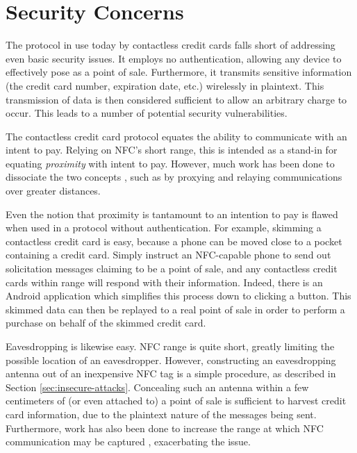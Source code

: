 \section{Security Concerns}
\label{sec:intro-security}

The protocol in use today by contactless credit cards falls short of addressing even basic security issues.
It employs no authentication, allowing any device to effectively pose as a point of sale.
Furthermore, it transmits sensitive information (the credit card number, expiration date, etc.) wirelessly in plaintext.
This transmission of data is then considered sufficient to allow an arbitrary charge to occur.
This leads to a number of potential security vulnerabilities.

The contactless credit card protocol equates the ability to communicate with an intent to pay.
Relying on NFC's short range, this is intended as a stand-in for equating \emph{proximity} with intent to pay.
However, much work has been done to dissociate the two concepts \cite{brown2013evaluating, Drimer:2007:KYE:1362903.1362910, francis2010practical, hancke2005practical, markantonakis2012practical}, such as by proxying and relaying communications over greater distances.

Even the notion that proximity is tantamount to an intention to pay is flawed when used in a protocol without authentication.
For example, skimming a contactless credit card is easy, because a phone can be moved close to a pocket containing a credit card.
Simply instruct an NFC-capable phone to send out solicitation messages claiming to be a point of sale, and any contactless credit cards within range will respond with their information.
Indeed, there is an Android application \cite{NFCProxy} which simplifies this process down to clicking a button.
This skimmed data can then be replayed to a real point of sale in order to perform a purchase on behalf of the skimmed credit card.

Eavesdropping is likewise easy.
NFC range is quite short, greatly limiting the possible location of an eavesdropper.
However, constructing an eavesdropping antenna out of an inexpensive NFC tag is a simple procedure, as described in Section \ref{sec:insecure-attacks}.
Concealing such an antenna within a few centimeters of (or even attached to) a point of sale is sufficient to harvest credit card information,
    due to the plaintext nature of the messages being sent.
Furthermore, work has also been done to increase the range at which NFC communication may be captured \cite{brown2013evaluating, kfir2005picking},
    exacerbating the issue.

